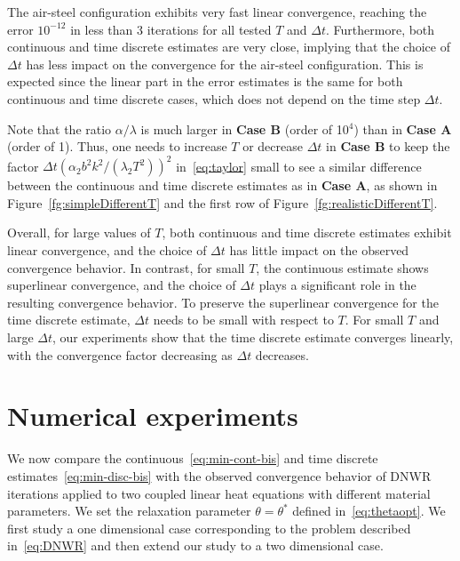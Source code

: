 \documentclass[reqno]{amsart}
\begin{document}
The air-steel configuration exhibits very fast linear convergence, reaching the error $10^{-12}$ in less than 3 iterations for all tested $T$ and $\Delta t$. Furthermore, both continuous and time discrete estimates are very close, implying that the choice of $\Delta t$ has less impact on the convergence for the air-steel configuration. This is expected since the linear part in the error estimates is the same for both continuous and time discrete cases, which does not depend on the time step $\Delta t$. 


Note that the ratio $\alpha/\lambda$ is much larger in {\bf Case B} (order of 10$^4$) than in {\bf Case A} (order of 1). Thus, one needs to increase $T$ or decrease $\Delta t$ in {\bf Case B} to keep the factor $\Delta t \left(\alpha_2 b^2 k^2/(\lambda_2 T^2)\right)^2$ in~\eqref{eq:taylor} small to see a similar difference between the continuous and time discrete estimates as in {\bf Case A}, as shown in Figure~\ref{fg:simpleDifferentT} and the first row of Figure~\ref{fg:realisticDifferentT}. 


Overall, for large values of $T$, both continuous and time discrete estimates exhibit linear convergence, and the choice of $\Delta t$ has little impact on the observed convergence behavior.
In contrast, for small $T$, the continuous estimate shows superlinear convergence, and the choice of $\Delta t$ plays a significant role in the resulting convergence behavior. 
To preserve the superlinear convergence for the time discrete estimate, $\Delta t$ needs to be small with respect to $T$. 
For small $T$ and large $\Delta t$, our experiments show that the time discrete estimate converges linearly, with the convergence factor decreasing as $\Delta t$ decreases.
\section{Numerical experiments}\label{sec:5}

We now compare the continuous~\eqref{eq:min-cont-bis} and time discrete estimates~\eqref{eq:min-disc-bis} with the observed convergence behavior of DNWR iterations applied to two coupled linear heat equations with different material parameters. We set the relaxation parameter $\theta = \theta^*$ defined in~\eqref{eq:thetaopt}. We first study a one dimensional case corresponding to the problem described in~\eqref{eq:DNWR} and then extend our study to a two dimensional case. 
\end{document}
